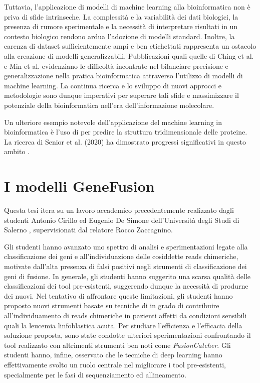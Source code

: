 Tuttavia, l'applicazione di modelli di machine learning alla bioinformatica non è priva di sfide intrinseche. La complessità e la variabilità dei dati biologici, la presenza di rumore sperimentale e la necessità di interpretare risultati in un contesto biologico rendono ardua l'adozione di modelli standard. Inoltre, la carenza di dataset sufficientemente ampi e ben etichettati rappresenta un ostacolo alla creazione di modelli generalizzabili. Pubblicazioni quali quelle di Ching et al. \cite{ching2018deep} e Min et al. \cite{min2017deep} evidenziano le difficoltà incontrate nel bilanciare precisione e generalizzazione nella pratica bioinformatica attraverso l'utilizzo di modelli di machine learning. La continua ricerca e lo sviluppo di nuovi approcci e metodologie sono dunque imperativi per superare tali sfide e massimizzare il potenziale della bioinformatica nell'era dell'informazione molecolare.

Un ulteriore esempio notevole dell'applicazione del machine learning in bioinformatica è l'uso di  per predire la struttura tridimensionale delle proteine. La ricerca di Senior et al. (2020) ha dimostrato progressi significativi in questo ambito \cite{senior2020improved}.

\section{I modelli GeneFusion}

Questa tesi itera su un lavoro accademico precedentemente realizzato dagli studenti Antonio Cirillo ed Eugenio De Simone dell'Università degli Studi di Salerno \cite{cirillo} \cite{desimone}, supervisionati dal relatore Rocco Zaccagnino.

Gli studenti hanno avanzato uno spettro di analisi e sperimentazioni legate alla classificazione dei geni e all'individuazione delle cosiddette reads chimeriche, motivate dall'alta presenza di falsi positivi negli strumenti di classificazione dei geni di fusione. In generale, gli studenti hanno suggerito una scarsa qualità delle classificazioni dei tool pre-esistenti, suggerendo dunque la necessità di produrne dei nuovi. Nel tentativo di affrontare queste limitazioni, gli studenti hanno proposto nuovi strumenti basate su tecniche di  in grado di contribuire all'individuamento di reads chimeriche in pazienti affetti da condizioni sensibili quali la leucemia linfoblastica acuta. Per studiare l'efficienza e l'efficacia della soluzione proposta, sono state condotte ulteriori sperimentazioni confrontando il tool realizzato con altrimenti strumenti ben noti come {\em FusionCatcher}. Gli studenti hanno, infine, osservato che le tecniche di deep learning hanno effettivamente svolto un ruolo centrale nel migliorare i tool pre-esistenti, specialmente per le fasi di sequenziamento ed allineamento.

